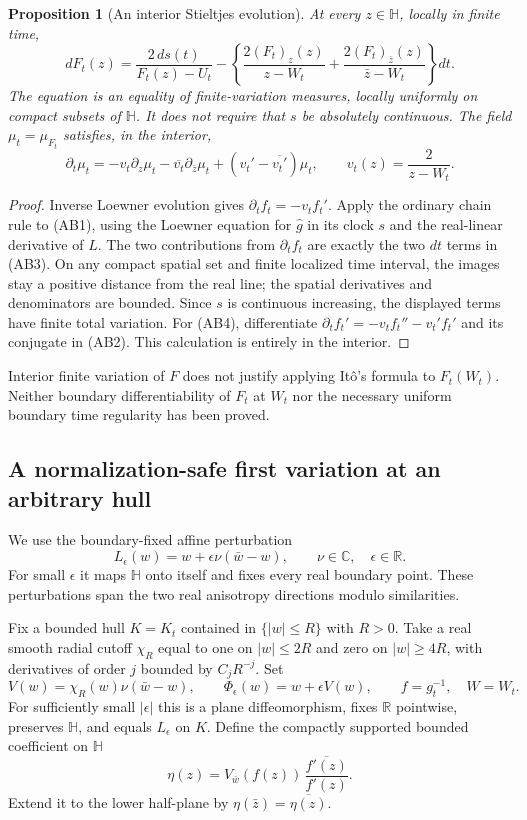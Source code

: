 \documentclass[11pt]{article}
\newtheorem{proposition}[theorem]{Proposition}
\theoremstyle{definition}\newtheorem{definition}[theorem]{Definition}
\theoremstyle{remark}\newtheorem{remark}[theorem]{Remark}
\begin{document}
\begin{proposition}[An interior Stieltjes evolution]
\label{prop:beltrami-stieltjes}
At every $z\in\mathbb H$, locally in finite time,
\[
 dF_t(z)=\frac{2\,ds(t)}{F_t(z)-U_t}
 -\left\{\frac{2(F_t)_z(z)}{z-W_t}
          +\frac{2(F_t)_{\bar z}(z)}{\bar z-W_t}\right\}dt.
 \tag{AB3}
\]
The equation is an equality of finite-variation measures, locally
uniformly on compact subsets of $\mathbb H$. It does not require that
$s$ be absolutely continuous. The field
$\mu_t=\mu_{F_t}$ satisfies, in the interior,
\[
 \partial_t\mu_t
 =-v_t\partial_z\mu_t-\overline{v_t}\partial_{\bar z}\mu_t
       +(v_t'-\overline{v_t'})\mu_t,
 \qquad v_t(z)=\frac2{z-W_t}.
 \tag{AB4}
\]
\end{proposition}
\begin{proof}
Inverse Loewner evolution gives $\partial_tf_t=-v_tf_t'$. Apply the
ordinary chain rule to (AB1), using the Loewner equation for
$\widehat g$ in its clock $s$ and the real-linear derivative of $L$.
The two contributions from $\partial_tf_t$ are exactly the two
$dt$ terms in (AB3). On any compact spatial set and finite localized
time interval, the images stay a positive distance from the real line;
the spatial derivatives and denominators are bounded. Since $s$ is
continuous increasing, the displayed terms have finite total variation.
For (AB4), differentiate
$\partial_tf_t'=-v_tf_t''-v_t'f_t'$
and its conjugate in (AB2). This calculation is entirely in the interior.
\end{proof}

Interior finite variation of $F$ does not justify applying It\^o's formula
to $F_t(W_t)$. Neither boundary differentiability of $F_t$ at $W_t$ nor
the necessary uniform boundary time regularity has been proved.

\subsection{A normalization-safe first variation at an arbitrary hull}

We use the boundary-fixed affine perturbation
\[
 L_\epsilon(w)=w+\epsilon\nu(\bar w-w),\qquad \nu\in\mathbb C,
 \quad \epsilon\in\mathbb R.
 \tag{AV1}
\]
For small $\epsilon$ it maps $\mathbb H$ onto itself and fixes every
real boundary point. These perturbations span the two real anisotropy
directions modulo similarities.

Fix a bounded hull $K=K_t$ contained in $\{|w|\le R\}$ with $R>0$.
Take a real smooth radial cutoff $\chi_R$ equal to one on $|w|\le2R$
and zero on $|w|\ge4R$, with derivatives of order $j$ bounded by
$C_jR^{-j}$. Set
\[
 V(w)=\chi_R(w)\nu(\bar w-w),\qquad
 \Phi_\epsilon(w)=w+\epsilon V(w),\qquad f=g_t^{-1},\quad W=W_t.
 \tag{AV2}
\]
For sufficiently small $|\epsilon|$ this is a plane diffeomorphism,
fixes $\mathbb R$ pointwise, preserves $\mathbb H$, and equals
$L_\epsilon$ on $K$. Define the compactly supported bounded coefficient
on $\mathbb H$
\[
 \eta(z)=V_{\bar w}(f(z))\,
                \frac{\overline{f'(z)}}{f'(z)}.
 \tag{AV3}
\]
Extend it to the lower half-plane by
$\eta(\bar z)=\overline{\eta(z)}$.
\end{document}
